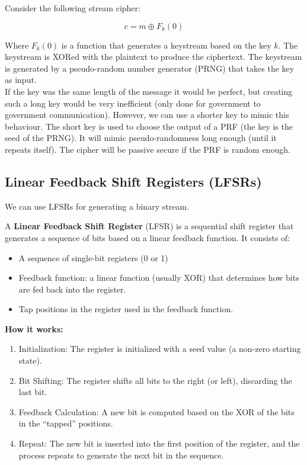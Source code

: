 Consider the following stream cipher:

\[ c = m \oplus F_k(0) \]

Where $F_k(0)$ is a function that generates a keystream based on the key $k$. The keystream is XORed with the plaintext to produce the ciphertext. The keystream is generated by a pseudo-random number generator (PRNG) that takes the key as input. \\

If the key was the same length of the message it would be perfect, but creating such a long key would be very inefficient (only done for government to government communication).
However, we can use a shorter key to mimic this behaviour. The short key is used to choose the output of a PRF (the key is the seed of the PRNG). It will mimic pseudo-randomness long enough (until it repeats itself). The cipher will be passive secure if the PRF is random enough.

\subsection{Linear Feedback Shift Registers (LFSRs)}
We can use LFSRs for generating a binary stream.

\begin{defn}
 A \textbf{Linear Feedback Shift Register} (LFSR) is a sequential shift register that generates a sequence of bits based on a linear feedback function. It consists of:
 \begin{itemize}
    \item A sequence of single-bit registers (0 or 1)
    \item Feedback function: a linear function (usually XOR) that determines how bits are fed back into the register.
    \item Tap positions in the register used in the feedback function.
 \end{itemize}
\end{defn}

\textbf{How it works:}
\begin{enumerate}
    \item Initialization: The register is initialized with a seed value (a non-zero starting state).
    \item Bit Shifting: The register shifts all bits to the right (or left), discarding the last bit.
    \item Feedback Calculation: A new bit is computed based on the XOR of the bits in the ``tapped'' positions.
    \item Repeat: The new bit is inserted into the first position of the register, and the process repeats to generate the next bit in the sequence.
\end{enumerate}

